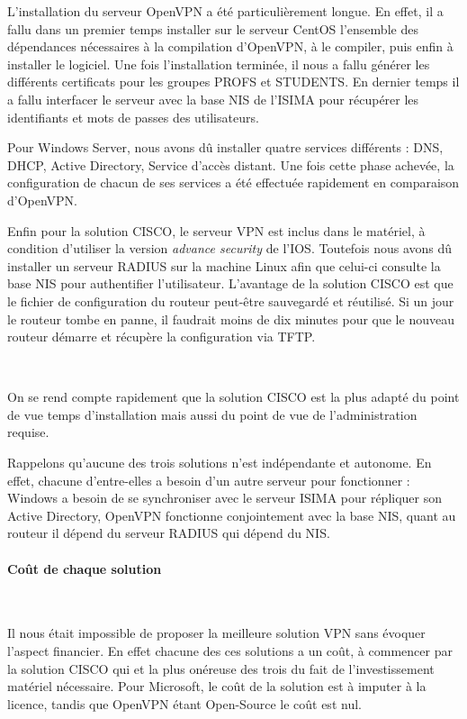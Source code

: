 L'installation du serveur OpenVPN a été particulièrement longue. En effet, il a fallu dans un premier temps installer sur le serveur CentOS l'ensemble des dépendances nécessaires à la compilation d'OpenVPN, à le compiler, puis enfin à installer le logiciel. Une fois l'installation terminée, il nous a fallu générer les différents certificats pour les groupes PROFS et STUDENTS. En dernier temps il a fallu interfacer le serveur avec la base NIS de l'ISIMA pour récupérer les identifiants et mots de passes des utilisateurs.

Pour Windows Server, nous avons dû installer quatre services différents : DNS, DHCP, Active Directory, Service d'accès distant. Une fois cette phase achevée, la configuration de chacun de ses services a été effectuée rapidement en comparaison d'OpenVPN.

Enfin pour la solution CISCO, le serveur VPN est inclus dans le matériel, à condition d'utiliser la version \textit{advance security} de l'IOS. Toutefois nous avons dû installer un serveur RADIUS sur la machine Linux afin que celui-ci consulte la base NIS pour authentifier l'utilisateur. L'avantage de la solution CISCO est que le fichier de configuration du routeur peut-être sauvegardé et réutilisé. Si un jour le routeur tombe en panne, il faudrait moins de dix minutes pour que le nouveau routeur démarre et récupère la configuration via TFTP.

~

On se rend compte rapidement que la solution CISCO est la plus adapté du point de vue temps d'installation mais aussi du point de vue de l'administration requise.

Rappelons qu'aucune des trois solutions n'est indépendante et autonome. En effet, chacune d'entre-elles a besoin d'un autre serveur pour fonctionner : Windows a besoin de se synchroniser avec le serveur ISIMA pour répliquer son Active Directory, OpenVPN fonctionne conjointement avec la base NIS, quant au routeur il dépend du serveur RADIUS qui dépend du NIS.

\pagebreak
\paragraph{Coût de chaque solution}
~

Il nous était impossible de proposer la meilleure solution VPN sans évoquer l'aspect financier. En effet chacune des ces solutions a un coût, à commencer par la solution CISCO qui et la plus onéreuse des trois du fait de l'investissement matériel nécessaire. Pour Microsoft, le coût de la solution est à imputer à la licence, tandis que OpenVPN étant Open-Source le coût est nul.

